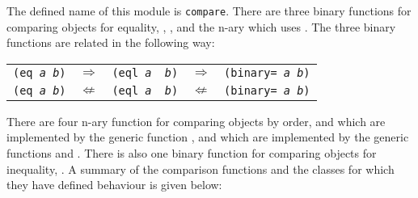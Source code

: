 \label{compare}
%
\begin{optDefinition}
%
The defined name of this module is {\tt compare}.  There are three binary
functions for comparing objects for equality, ,
,  and the n-ary \functionref{=} which uses
.  The three binary functions are related in the following
way:
%
\begin{center}
\begin{tabular}{rcccl}
    {\tt (eq {\em a} {\em b})} & $\Rightarrow$ & {\tt (eql {\em a} {\em
            b})} & $\Rightarrow$ & {\tt (binary= {\em a} {\em b})}\\
    {\tt (eq {\em a} {\em b})} & $\not\Leftarrow$ & {\tt (eql {\em a} {\em
            b})} & $\not\Leftarrow$ & {\tt (binary= {\em a} {\em b})}\\
\end{tabular}
\end{center}
%
There are four n-ary function for comparing objects by order, \functionref{<}
and \functionref{>} which are implemented by the generic function
, \functionref{<=} and \functionref{>=} which are
implemented by the generic functions  and
.  There is also one binary function for comparing objects
for inequality, \functionref{!=}.  A summary of the comparison functions and the
classes for which they have defined behaviour is given below:


\end{optDefinition}
